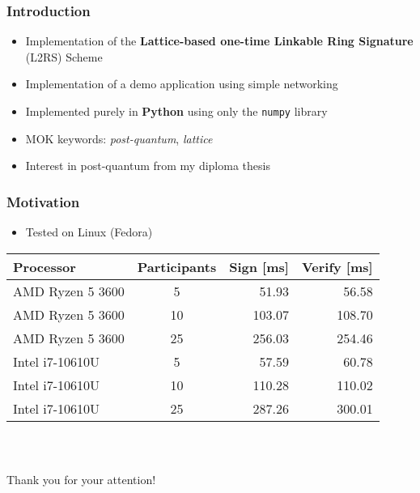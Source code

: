 \documentclass[%
  14pt,       				%
	t,                  %
	aspectratio=1610,   %
	unicode,						%
]{beamer}				    	%
\begin{document}
\disablenavigationsymbols

\maketitle


\begin{frame}[c]
	\frametitle{Introduction}
	\large{
		\begin{itemize}
			\item Implementation of the \textbf{Lattice-based one-time Linkable Ring Signature} (L2RS) Scheme
			\item Implementation of a demo application using simple networking
			\item Implemented purely in \textbf{Python} using only the \texttt{numpy} library
			\item MOK keywords: \textit{post-quantum}, \textit{lattice}
			\item Interest in post-quantum from my diploma thesis
		\end{itemize}
	}
\end{frame}

\begin{frame}[c]
	\frametitle{Motivation}
	\large{
		\begin{itemize}
			\item Tested on Linux (Fedora)
		\end{itemize}
	}
	\begin{table}[htbp]
		\centering
		\begin{tabular}{|l|c|r|r|}
			\hline
			Processor        & Participants & Sign [ms] & Verify [ms] \\
			\hline
			AMD Ryzen 5 3600 & 5            & 51.93     & 56.58       \\
			AMD Ryzen 5 3600 & 10           & 103.07    & 108.70      \\
			AMD Ryzen 5 3600 & 25           & 256.03    & 254.46      \\
			Intel i7-10610U  & 5            & 57.59     & 60.78       \\
			Intel i7-10610U  & 10           & 110.28    & 110.02      \\
			Intel i7-10610U  & 25           & 287.26    & 300.01      \\
			\hline
		\end{tabular}
	\end{table}
\end{frame}

\begin{frame}[c]
	\frametitle{\mbox{ }}
	\begin{center}
		{\Huge Thank you for your attention!}
	\end{center}
\end{frame}
\end{document}
